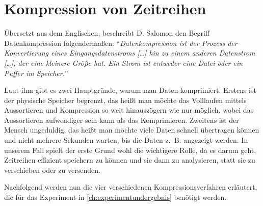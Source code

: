 \section{Kompression von Zeitreihen}
\newcommand{\tikztextl}[3]{\node at (#1, #2) {\rlap{\vphantom{/}\smash{#3}}};}
\newcommand{\tikztextr}[3]{\node at (#1, #2) {\llap{\vphantom{/}\smash{#3}}};}
\newcommand{\waveletfunction}[1]{%
 \begin{tikzpicture}[x = 20mm, y = 20mm]
  \useasboundingbox (-0.45, -1.5) rectangle (1.2, 1.7);
  \draw [->] (-0.1, 0) -- (1.2, 0);
  \draw [->] (0, -1.5) -- (0, 1.7);
  \tikztextr{1.2}{0.15}{$x$}
  \tikztextl{0.075}{1.65}{$y$}
  \tikztextc{0}{-0.15}{$0$}
  \tikztextc{0.5}{-0.15}{$0{,}5$}
  \tikztextc{1}{-0.15}{$1$}
  \tikztextr{-0.075}{-1.414}{$-\sqrt2$}
  \tikztextr{-0.075}{-1}{$-1$}
  \tikztextr{-0.075}{1}{$1$}
  \tikztextr{-0.075}{1.414}{$\sqrt2$}
  \draw [blue, thick] (-0.05, 0) -| #1 -- (1.05, 0);
 \end{tikzpicture}%
}
Übersetzt aus dem Englischen, beschreibt D. Salomon den Begriff Datenkompression \cite[p. 1-2]{dataCompressionSalmon} folgendermaßen: "`\textit{Datenkompression ist der Prozess der Konvertierung eines Eingangsdatenstroms [\ldots] hin zu einem anderen Datenstrom [\ldots], der eine kleinere Größe hat. Ein Strom ist entweder eine Datei oder ein Puffer im Speicher.}"'

Laut ihm gibt es zwei Hauptgründe, warum man Daten komprimiert. Erstens ist der physische Speicher begrenzt, das heißt man möchte das Volllaufen mittels Aussortieren und Kompression so weit hinauszögern wie nur möglich, wobei das Aussortieren aufwendiger sein kann als das Komprimieren. Zweitens ist der Mensch ungeduldig, das heißt man möchte viele Daten schnell übertragen können und nicht mehrere Sekunden warten, bis die Daten z.~B. angezeigt werden. In unserem Fall spielt der erste Grund wohl die wichtigere Rolle, da es darum geht, Zeitreihen effizient speichern zu können und sie dann zu analysieren, statt sie zu verschieben oder zu versenden.

Nachfolgend werden nun die vier verschiedenen Kompressionsverfahren erläutert, die für das Experiment in \autoref{ch:experimentundergebnis} benötigt werden.

